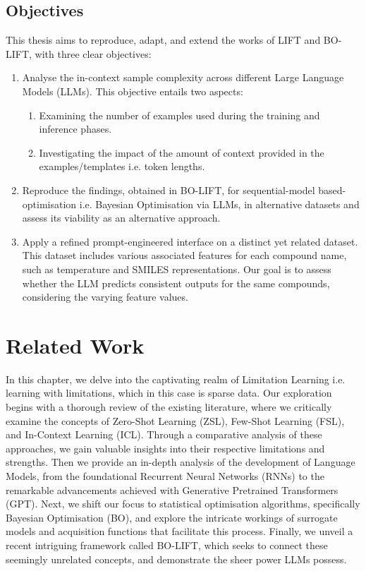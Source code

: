 \documentclass{report}
\begin{document}
\section{Objectives}
This thesis aims to reproduce, adapt, and extend the works of LIFT and BO-LIFT, with three clear objectives:
\begin{enumerate}
	\item Analyse the in-context sample complexity across different Large
	Language Models (LLMs). This objective entails two aspects:
	 \begin{enumerate}[label=\alph*)]
		\item Examining the number of examples used during the training and
		inference phases.
		\item Investigating the impact of the amount of context provided in the
		examples/templates i.e. token lengths.
	\end{enumerate}
	\item Reproduce the findings, obtained in BO-LIFT, for sequential-model
	based-optimisation i.e. Bayesian Optimisation via LLMs, in alternative
	datasets and assess its viability as an alternative approach.
	\item Apply a refined prompt-engineered interface on a distinct yet related
	dataset. This dataset includes various associated features for each
	compound name, such as temperature and SMILES representations. Our
	goal is to assess whether the LLM predicts consistent outputs for the same
	compounds, considering the varying feature values.
\end{enumerate}
\chapter{Related Work}
In this chapter, we delve into the captivating realm of Limitation Learning i.e. learning with limitations, which in this case is sparse data. Our exploration begins with a thorough review of the existing literature, where we critically examine the concepts of Zero-Shot Learning (ZSL), Few-Shot Learning (FSL), and In-Context Learning (ICL). Through a comparative analysis of these approaches, we gain valuable insights into their respective limitations and strengths. Then we provide an in-depth analysis of the development of Language Models, from the foundational Recurrent Neural Networks (RNNs) to the remarkable advancements achieved with Generative Pretrained Transformers (GPT). Next, we shift our focus to statistical optimisation algorithms, specifically Bayesian Optimisation (BO), and explore the intricate workings of surrogate models and acquisition functions that facilitate this process. Finally, we unveil a recent intriguing framework called BO-LIFT, which seeks to connect these seemingly unrelated concepts, and demonstrate the sheer power LLMs possess.
\end{document}
